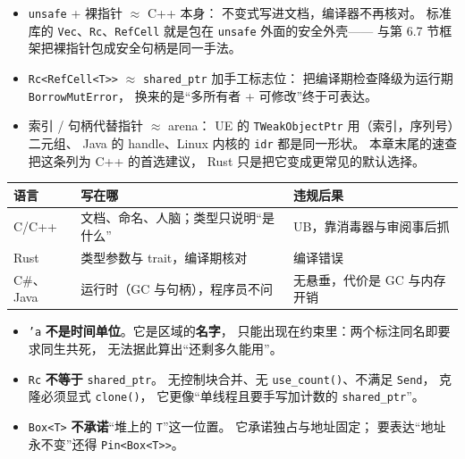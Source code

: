 \documentclass[12pt,a4paper,fontset=fandol]{ctexbook}
\begin{document}
\begin{itemize}
  \item \texttt{unsafe} + 裸指针 $\approx$ C++ 本身：
        不变式写进文档，编译器不再核对。
        标准库的 \texttt{Vec}、\texttt{Rc}、\texttt{RefCell}
        就是包在 \texttt{unsafe} 外面的安全外壳——
        与第 6.7 节框架把裸指针包成安全句柄是同一手法。
  \item \texttt{Rc<Ref\allowbreak{}Cell<T>>} $\approx$ \texttt{shared\_ptr} 加手工标志位：
        把编译期检查降级为运行期 \texttt{Borrow\allowbreak{}Mut\allowbreak{}Error}，
        换来的是``多所有者 + 可修改''终于可表达。
  \item 索引 / 句柄代替指针 $\approx$ arena：
        UE 的 \texttt{TWeakObjectPtr} 用（索引，序列号）二元组、
        Java 的 handle、Linux 内核的 \texttt{idr} 都是同一形状。
        本章末尾的速查把这条列为 C++ 的首选建议，
        Rust 只是把它变成更常见的默认选择。
\end{itemize}

\begin{compare}[title=三种语言把``活多久''写在哪一层]
\begin{tabular}{@{}>{\raggedright\arraybackslash}p{}>{\raggedright\arraybackslash}p{}>{\raggedright\arraybackslash}p{}@{}}
\toprule
\textbf{语言} & \textbf{写在哪} & \textbf{违规后果} \\
\midrule
C/C++ & 文档、命名、人脑；类型只说明``是什么'' &
  UB，靠消毒器与审阅事后抓 \\
Rust & 类型参数与 trait，编译期核对 & 编译错误 \\
C\#、Java & 运行时（GC 与句柄），程序员不问 &
  无悬垂，代价是 GC 与内存开销 \\
\bottomrule
\end{tabular}
\end{compare}

\begin{warning}[title=三条易错类比]
\begin{itemize}
  \item \texttt{'a} \textbf{不是时间单位}。它是区域的\textbf{名字}，
        只能出现在约束里：两个标注同名即要求同生共死，
        无法据此算出``还剩多久能用''。
  \item \texttt{Rc} \textbf{不等于} \texttt{shared\_ptr}。
        无控制块合并、无 \texttt{use\_count()}、不满足 \texttt{Send}，
        克隆必须显式 \texttt{clone()}，
        它更像``单线程且要手写加计数的 \texttt{shared\_ptr}''。
  \item \texttt{Box<T>} \textbf{不承诺}``堆上的 \texttt{T}''这一位置。
        它承诺独占与地址固定；
        要表达``地址永不变''还得 \texttt{Pin<Box<T>>}。
\end{itemize}
\end{warning}
\end{document}
